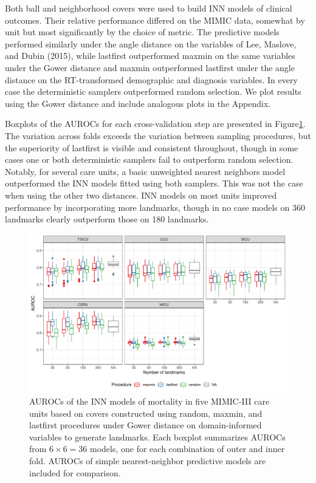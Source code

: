 \documentclass{article}
\begin{document}
Both ball and neighborhood covers were used to build INN models of
clinical outcomes. Their relative performance differed on the MIMIC
data, somewhat by unit but most significantly by the choice of metric.
The predictive models performed similarly under the angle distance on
the variables of Lee, Maslove, and Dubin (2015), while lastfirst
outperformed maxmin on the same variables under the Gower distance and
maxmin outperformed lastfirst under the angle distance on the
RT-transformed demographic and diagnosis variables. In every case the
deterministic samplers outperformed random selection. We plot results
using the Gower distance and include analogous plots in the Appendix.

Boxplots of the AUROCs for each cross-validation step are presented in
Figure\nbs\ref{fig:knn-mimic-gower}. The variation across folds exceeds
the variation between sampling procedures, but the superiority of
lastfirst is visible and consistent throughout, though in some cases one
or both deterministic samplers fail to outperform random selection.
Notably, for several care units, a basic unweighted nearest neighbors
model outperformed the INN models fitted using both samplers. This was
not the case when using the other two distances. INN models on most
units improved performance by incorporating more landmarks, though in no
case models on 360 landmarks clearly outperform those on 180 landmarks.

\begin{figure}
\includegraphics[width=\textwidth]{knn-gower-auc-2}
\caption{
AUROCs of the INN models of mortality in five MIMIC-III care units based on covers constructed using random, maxmin, and lastfirst procedures under Gower distance on domain-informed variables to generate landmarks.
Each boxplot summarizes AUROCs from $6 \times 6 = 36$ models, one for each combination of outer and inner fold.
AUROCs of simple nearest-neighbor predictive models are included for comparison.
\label{fig:knn-mimic-gower}
}
\end{figure}
\end{document}

